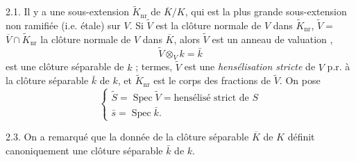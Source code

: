 \documentclass[11pt,a4paper]{article}
\begin{document}
2.1. Il y a une sous-extension $\widetilde{K}_{\mathrm{nr}}$ de $\overline{K}/K$, qui est la plus grande sous-extension non ramifiée (i.e. étale) sur $V$. Si \struck{\ill{}} $\widetilde{V}$ est la clôture normale de $V$ dans $\widetilde{K}_{\mathrm{nr}}$, $\widetilde{V} = {}$\struck{\ill{}} $\overline{V} \cap \widetilde{K}_{\mathrm{nr}}$ la clôture normale de \struck{\ill{}} $V$ dans $\overline{K}$, alors $\widetilde{V}$ est un anneau de valuation , 
\[
  \widetilde{V} \otimes_V k = \bar{k}
\]
est une  clôture séparable de $k$ ;  termes, $\widetilde{V}$ est une \emph{hensélisation stricte} de $V$ p.r. à \struck{\ill{}} la clôture séparable $\bar k$ de $k$, et $\widetilde{K}_{\mathrm{nr}}$ est le corps des fractions de $\widetilde{V}$. On pose
\[
  \begin{cases} \widetilde{S} = \operatorname{Spec}\widetilde{V} = \text{hensélisé strict de } S \\ \bar{s} = \operatorname{Spec}\bar{k} . \end{cases}
\]

2.3. On a remarqué que la donnée de la clôture séparable $\overline{K}$ de $K$ définit canoniquement une clôture séparable $\bar k$ de $k$.   \struck{\ill{}}  \ill{}

\end{document}
